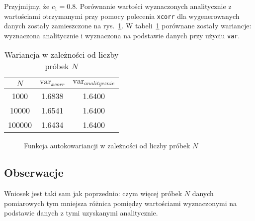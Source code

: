 \documentclass[11pt, a4paper]{article}
\begin{document}
Przyjmijmy, że $c_1 = 0.8$.
Porównanie wartości wyznaczonych analitycznie z wartościami otrzymanymi przy pomocy polecenia \texttt{xcorr} dla wygenerowanych danych zostały zamieszczone na rys.~\ref{fig:zd3_ma_2}. W tabeli~\ref{tbl:zd3_ma} porównane zostały wariancje: wyznaczona analitycznie i wyznaczona na podstawie danych przy użyciu \texttt{var}.
\begin{table}[htbp!]
	\centering
	\begin{tabular}{c||c|c}
		$N$ & $\text{var}_{xcorr}$ & $\text{var}_{analitycznie}$ \\
		\hline
		1000 & 1.6838 & 1.6400 \\
		10000 & 1.6541 & 1.6400 \\
		100000 & 1.6434 & 1.6400 \\
	\end{tabular}
	\caption{Wariancja w zależności od liczby próbek $N$}
	\label{tbl:zd3_ma}
\end{table}

\begin{figure}[p!]
	\centering
	
	\hfill%
	
	\hfill%
	
	\hfill%
	
	\caption{Funkcja autokowariancji w zależności od liczby próbek $N$}
	\label{fig:zd3_ma_2}
\end{figure}

\subsection*{Obserwacje}
Wniosek jest taki sam jak poprzednio: czym więcej próbek $N$ danych pomiarowych tym mniejsza różnica
pomiędzy wartościami wyznaczonymi na podstawie danych z tymi uzyskanymi analitycznie.
\end{document}
